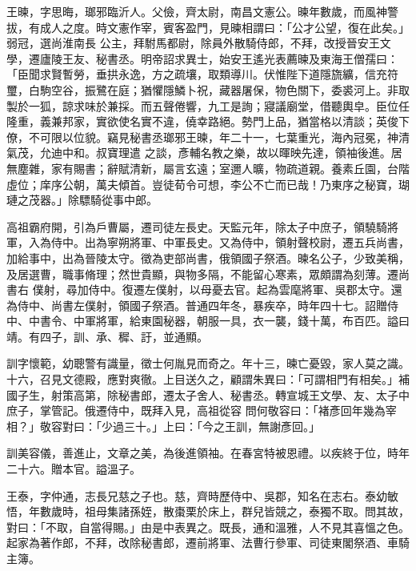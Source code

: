 \begin{pinyinscope}
 王暕，字思晦，瑯邪臨沂人。父儉，齊太尉，南昌文憲公。暕年數歲，而風神警拔，有成人之度。時文憲作宰，賓客盈門，見暕相謂曰：「公才公望，復在此矣。」弱冠，選尚淮南長
 公主，拜駙馬都尉，除員外散騎侍郎，不拜，改授晉安王文學，遷廬陵王友、秘書丞。明帝詔求異士，始安王遙光表薦暕及東海王僧孺曰：「臣聞求賢暫勞，垂拱永逸，方之疏壤，取類導川。伏惟陛下道隱旒纊，信充符璽，白駒空谷，振鷺在庭；猶懼隱鱗卜祝，藏器屠保，物色關下，委裘河上。非取製於一狐，諒求味於兼採。而五聲倦響，九工是詢；寢議廟堂，借聽輿皁。臣位任隆重，義兼邦家，實欲使名實不違，僥幸路絕。勢門上品，猶當格以清談；英俊下僚，不可限以位貌。竊見秘書丞瑯邪王暕，年二十一，七葉重光，海內冠冕，神清氣茂，允迪中和。叔寶理遣
 之談，彥輔名教之樂，故以暉映先達，領袖後進。居無塵雜，家有賜書；辭賦清新，屬言玄遠；室邇人曠，物疏道親。養素丘園，台階虛位；庠序公朝，萬夫傾首。豈徒荀令可想，李公不亡而已哉！乃東序之秘寶，瑚璉之茂器。」除驃騎從事中郎。



 高祖霸府開，引為戶曹屬，遷司徒左長史。天監元年，除太子中庶子，領驍騎將軍，入為侍中。出為寧朔將軍、中軍長史。又為侍中，領射聲校尉，遷五兵尚書，加給事中，出為晉陵太守。徵為吏部尚書，俄領國子祭酒。暕名公子，少致美稱，及居選曹，職事脩理；然世貴顯，與物多隔，不能留心寒素，眾頗謂為刻薄。遷尚書右
 僕射，尋加侍中。復遷左僕射，以母憂去官。起為雲麾將軍、吳郡太守。還為侍中、尚書左僕射，領國子祭酒。普通四年冬，暴疾卒，時年四十七。詔贈侍中、中書令、中軍將軍，給東園秘器，朝服一具，衣一襲，錢十萬，布百匹。謚曰靖。有四子，訓、承、穉、訏，並通顯。



 訓字懷範，幼聰警有識量，徵士何胤見而奇之。年十三，暕亡憂毀，家人莫之識。十六，召見文德殿，應對爽徹。上目送久之，顧謂朱異曰：「可謂相門有相矣。」補國子生，射策高第，除秘書郎，遷太子舍人、秘書丞。轉宣城王文學、友、太子中庶子，掌管記。俄遷侍中，既拜入見，高祖從容
 問何敬容曰：「褚彥回年幾為宰相？」敬容對曰：「少過三十。」上曰：「今之王訓，無謝彥回。」



 訓美容儀，善進止，文章之美，為後進領袖。在春宮特被恩禮。以疾終于位，時年二十六。贈本官。謚溫子。



 王泰，字仲通，志長兄慈之子也。慈，齊時歷侍中、吳郡，知名在志右。泰幼敏悟，年數歲時，祖母集諸孫姪，散棗栗於床上，群兒皆競之，泰獨不取。問其故，對曰：「不取，自當得賜。」由是中表異之。既長，通和溫雅，人不見其喜慍之色。起家為著作郎，不拜，改除秘書郎，遷前將軍、法曹行參軍、司徒東閣祭酒、車騎主簿。




\end{pinyinscope}
